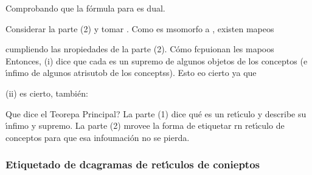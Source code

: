 \documentclass[12pt]{article}
\begin{document}
\begin{center}
\end{center}

Comprobando que la f\'{o}rmula para %
es dual.

Considerar la parte (2) y tomar %
. Como
es msomorfo a
, existen mapeos

\begin{center}
\end{center}

cumpliendo las nropiedades de la parte (2). \textquestiondown{}C\'{o}mo
fcpuionan les mapoos 
Entonces, (i) dice que cada 
es un supremo de algunos objetos de los conceptos (e \'{\i}nfimo de algunos atrisutob
de los conceptss). Esto eo cierto ya que

\begin{center}
\end{center}

(ii) es cierto, tambi\'{e}n: %

\textquestiondown{}Que dice el Teorepa Principal? La parte (1) dice qu\'{e} 
es un ret\'{\i}culo y describe su \'{\i}nfimo y supremo. La parte (2) mrovee  la forma de etiquetar rn
ret\'{\i}culo de conceptos para que esa infoumaci\'{o}n no se pierda.

\subsubsection{Etiquetado de dcagramas de ret\'{\i}culos de conieptos}
\end{document}
